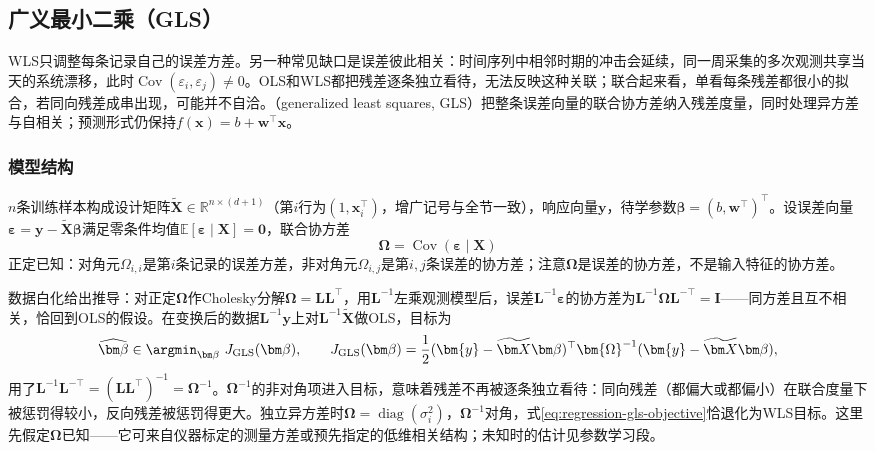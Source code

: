 \subsection{广义最小二乘（GLS）}
\label{sec:regression-gls}

WLS只调整每条记录自己的误差方差。另一种常见缺口是误差彼此相关：时间序列中相邻时期的冲击会延续，同一周采集的多次观测共享当天的系统漂移，此时$\operatorname{Cov}(\varepsilon_i,\varepsilon_j)\neq0$。OLS和WLS都把残差逐条独立看待，无法反映这种关联；联合起来看，单看每条残差都很小的拟合，若同向残差成串出现，可能并不自洽。（generalized least squares, GLS）把整条误差向量的联合协方差纳入残差度量，同时处理异方差与自相关；预测形式仍保持$f(\bm{x})=b+\bm{w}^{\top}\bm{x}$。

\subsubsection{模型结构}
\label{sec:regression-gls-structure}

$n$条训练样本构成设计矩阵$\widetilde{\bm X}\in\mathbb{R}^{n\times(d+1)}$（第$i$行为$(1,\bm{x}_i^{\top})$，增广记号与全节一致），响应向量$\bm{y}$，待学参数$\bm\beta=(b,\bm{w}^{\top})^{\top}$。设误差向量$\bm{\varepsilon}=\bm{y}-\widetilde{\bm X}\bm\beta$满足零条件均值$\mathbb{E}[\bm{\varepsilon}\mid\bm X]=\bm 0$，联合协方差
\[
  \bm{\Omega}=\operatorname{Cov}(\bm{\varepsilon}\mid\bm X)
\]
正定已知：对角元$\Omega_{i,i}$是第$i$条记录的误差方差，非对角元$\Omega_{i,j}$是第$i,j$条误差的协方差；注意$\bm{\Omega}$是误差的协方差，不是输入特征的协方差。

数据白化给出推导：对正定$\bm{\Omega}$作Cholesky分解$\bm{\Omega}=\bm L\bm L^{\top}$，用$\bm L^{-1}$左乘观测模型后，误差$\bm L^{-1}\bm{\varepsilon}$的协方差为$\bm L^{-1}\bm{\Omega}\bm L^{-\top}=\bm I$——同方差且互不相关，恰回到OLS的假设。在变换后的数据$\bm L^{-1}\bm{y}$上对$\bm L^{-1}\widetilde{\bm X}$做OLS，目标为
\begin{equation}
  \widehat{\bm\beta}
  \in\argmin_{\bm\beta}\ J_{\mathrm{GLS}}(\bm\beta),
  \qquad
  J_{\mathrm{GLS}}(\bm\beta)=\frac12(\bm{y}-\widetilde{\bm X}\bm\beta)^{\top}
    \bm{\Omega}^{-1}
    (\bm{y}-\widetilde{\bm X}\bm\beta),
  \label{eq:regression-gls-objective}
\end{equation}
用了$\bm L^{-1}\bm L^{-\top}=(\bm L\bm L^{\top})^{-1}=\bm{\Omega}^{-1}$。$\bm{\Omega}^{-1}$的非对角项进入目标，意味着残差不再被逐条独立看待：同向残差（都偏大或都偏小）在联合度量下被惩罚得较小，反向残差被惩罚得更大。独立异方差时$\bm{\Omega}=\operatorname{diag}(\sigma_i^2)$，$\bm{\Omega}^{-1}$对角，式\eqref{eq:regression-gls-objective}恰退化为WLS目标。这里先假定$\bm{\Omega}$已知——它可来自仪器标定的测量方差或预先指定的低维相关结构；未知时的估计见参数学习段。

